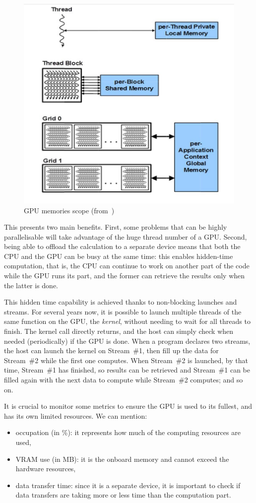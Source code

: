 \begin{figure}[h]
	\centering
	\includegraphics[width=0.6\linewidth]{gpu-memory-scope}
	\caption{GPU memories scope (from~\cite{nvidia:keplerarch})}
	\label{fig:gpu-memory-scope}
\end{figure}


This presents two main benefits. First, some problems that can be highly parallelisable will take advantage of the huge thread number of a GPU. Second, being able to offload the calculation to a separate device means that both the CPU and the GPU can be busy at the same time: this enables hidden-time computation, that is, the CPU can continue to work on another part of the code while the GPU runs its part, and the former can retrieve the results only when the latter is done.

This hidden time capability is achieved thanks to non-blocking launches and streams. For several years now, it is possible to launch multiple threads of the same function on the GPU, the \emph{kernel}, without needing to wait for all threads to finish. The kernel call directly returns, and the host can simply check when needed (periodically) if the GPU is done. When a program declares two streams, the host can launch the kernel on Stream~\#1, then fill up the data for Stream~\#2 while the first one computes. When Stream~\#2 is launched, by that time, Stream~\#1 has finished, so results can be retrieved and Stream~\#1 can be filled again with the next data to compute while Stream~\#2 computes; and so on.

It is crucial to monitor some metrics to ensure the GPU is used to its fullest, and has its own limited resources. We can mention:

\begin{itemize}
	\item occupation (in \%): it represents how much of the computing resources are used,
	\item VRAM use (in MB): it is the onboard memory and cannot exceed the hardware resources,
	\item data transfer time: since it is a separate device, it is important to check if data transfers are taking more or less time than the computation part.
\end{itemize}
